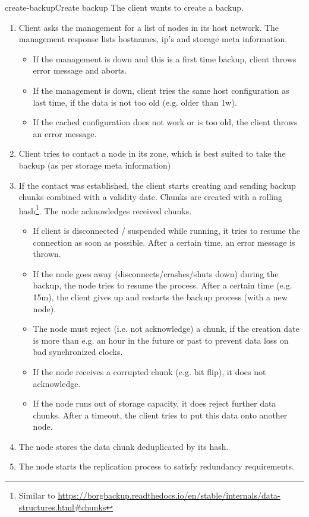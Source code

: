 \begin{scenario}{create-backup}{Create backup}
    The client wants to create a backup.
    
    \begin{enumerate}
    	\item Client asks the management for a list of nodes in its host network. The management response lists hostnames, ip's and storage meta information.
    		\begin{itemize}
    			\item If the management is down and this is a first time backup, client throws error message and aborts.
   				\item If the management is down, client tries the same host configuration as last time, if the data is not too old (e.g. older than 1w).
   				\item If the cached configuration does not work or is too old, the client throws an error message.
   			\end{itemize}
   		\item Client tries to contact a node in its zone, which is best suited to take the backup (as per storage meta information)
   		\item If the contact was established, the client starts creating and sending backup chunks combined with a validity date. Chunks are created with a rolling hash\footnote{Similar to \url{https://borgbackup.readthedocs.io/en/stable/internals/data-structures.html\#chunks}}. The node acknowledges received chunks.
	   		 \begin{itemize}
	   			\item If client is disconnected / suspended while running, it tries to resume the connection as soon as possible. After a certain time, an error message is thrown.
	   			\item If the node goes away (disconnects/crashes/shuts down) during the backup, the node tries to resume the process. After a certain time (e.g. 15m), the client gives up and restarts the backup process (with a new node).
	   			\item The node must reject (i.e. not acknowledge) a chunk, if the creation date is more than e.g. an hour in the future or past to prevent data loss on bad synchronized clocks.
	   			\item If the node receives a corrupted chunk (e.g. bit flip), it does not acknowledge.
	   			\item If the node runs out of storage capacity, it does reject further data chunks. After a timeout, the client tries to put this data onto another node.
	   		\end{itemize}
	   	\item The node stores the data chunk deduplicated by its hash.
	   	\item The node starts the replication process to satisfy redundancy requirements.
    \end{enumerate}
\end{scenario}


